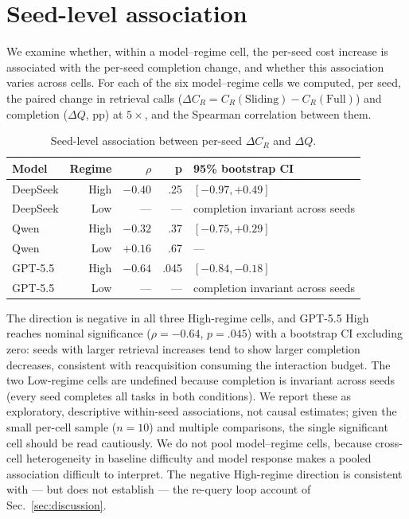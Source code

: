 \documentclass[11pt]{article}
\begin{document}
\appendix
\section{Seed-level association}
\label{app:seed}

We examine whether, within a model--regime cell, the per-seed cost increase is associated
with the per-seed completion change, and whether this association varies across cells.
For each of the six model--regime cells we computed, per seed, the paired change in
retrieval calls ($\Delta C_R = C_R(\text{Sliding}) - C_R(\text{Full})$) and completion ($\Delta Q$, pp) at $5\times$, and the
Spearman correlation between them.

\begin{table}[h]
\centering
\small
\caption{Seed-level association between per-seed $\Delta C_R$ and $\Delta Q$.}
\label{tab:seed}
\begin{tabular}{@{}lrrrl@{}}
\toprule
Model & Regime & $\rho$ & p & 95\% bootstrap CI \\
\midrule
DeepSeek & High & $-0.40$ & .25 & $[-0.97, +0.49]$ \\
DeepSeek & Low & --- & --- & completion invariant across seeds \\
Qwen & High & $-0.32$ & .37 & $[-0.75, +0.29]$ \\
Qwen & Low & $+0.16$ & .67 & --- \\
GPT-5.5 & High & $-0.64$ & .045 & $[-0.84, -0.18]$ \\
GPT-5.5 & Low & --- & --- & completion invariant across seeds \\
\bottomrule
\end{tabular}
\end{table}

The direction is negative in all three High-regime cells, and GPT-5.5 High reaches
nominal significance ($\rho = -0.64$, $p = .045$) with a bootstrap CI excluding zero: seeds with
larger retrieval increases tend to show larger completion decreases, consistent with
reacquisition consuming the interaction budget. The two Low-regime cells are undefined
because completion is invariant across seeds (every seed completes all tasks in both
conditions). We report these as exploratory, descriptive within-seed associations, not
causal estimates; given the small per-cell sample ($n = 10$) and multiple comparisons, the
single significant cell should be read cautiously. We do not pool model--regime cells,
because cross-cell heterogeneity in baseline difficulty and model response makes a pooled
association difficult to interpret. The negative High-regime direction is consistent with
--- but does not establish --- the re-query loop account of Sec.~\ref{sec:discussion}.
\end{document}
